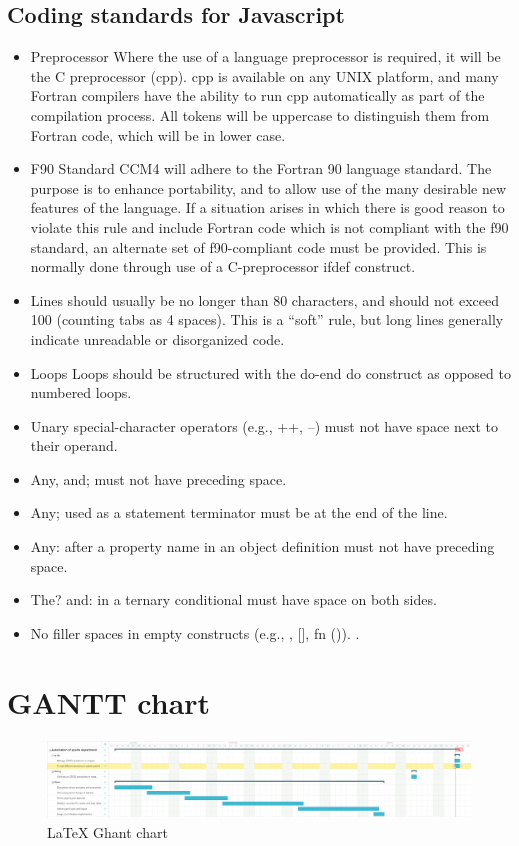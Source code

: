 \subsection{Coding standards for Javascript }
\begin{itemize}

\item Preprocessor Where the use of a language preprocessor is required, it will be the C preprocessor (cpp). cpp is available on any UNIX platform, and many Fortran compilers have the ability to run cpp automatically as part of the compilation process. All tokens will be uppercase to distinguish them from Fortran code, which will be in lower case.

\item F90 Standard CCM4 will adhere to the Fortran 90 language standard. The purpose is to enhance portability, and to allow use of the many desirable new features of the language. If a situation arises in which there is good reason to violate this rule and include Fortran code which is not compliant with the f90 standard, an alternate set of f90-compliant code must be provided. This is normally done through use of a C-preprocessor ifdef construct.
\item Lines should usually be no longer than 80 characters, and should not exceed 100 (counting tabs as 4 spaces). This is a “soft” rule, but long lines generally indicate unreadable or disorganized code.
\item Loops Loops should be structured with the do-end do construct as opposed to numbered loops.
\item Unary special-character operators (e.g., ++, --) must not have space next to their operand.
\item Any, and; must not have preceding space.
\item Any; used as a statement terminator must be at the end of the line.
\item Any: after a property name in an object definition must not have preceding space.
\item The? and: in a ternary conditional must have space on both sides.
\item No filler spaces in empty constructs (e.g., {}, [], fn ()).
.


\end{itemize}

	\section{GANTT chart
	}
	\begin{figure}[ht]
\centering
\includegraphics[scale=0.20]{images/GhanttChart.png}
\caption{\LaTeX{} Ghant chart}
\end{figure}
	
